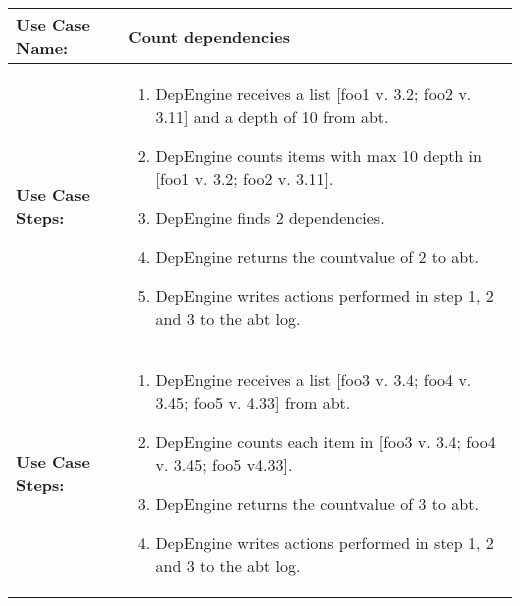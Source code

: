 
\begin{tabularx}{\linewidth}{|l|X|}
\hline
\textbf{Use Case Name:} & \textbf{Count dependencies} \\
\hline
\textbf{Use Case Steps:} & 
\begin{minipage}{\linewidth} 
 \vspace{0.05em}
  \begin{enumerate}
   \item DepEngine receives a list [foo1 v. 3.2; foo2 v. 3.11] and a depth of 10 from abt.
   \item DepEngine counts items with max 10 depth in [foo1 v. 3.2; foo2 v. 3.11].
   \item DepEngine finds 2 dependencies.
   \item DepEngine returns the countvalue of 2 to abt.
   \item DepEngine writes actions performed in step 1, 2 and 3 to the abt log.
  \end{enumerate}
 \vspace{0.05em}
\end{minipage}
\\
\hline 
\textbf{Use Case Steps:} & 
\begin{minipage}{\linewidth} 
 \vspace{0.05em}
  \begin{enumerate}
   \item DepEngine receives a list [foo3 v. 3.4; foo4 v. 3.45; foo5 v. 4.33] from abt.
   \item DepEngine counts each item in [foo3 v. 3.4; foo4 v. 3.45; foo5 v4.33].
   \item DepEngine returns the countvalue of 3 to abt.
   \item DepEngine writes actions performed in step 1, 2 and 3 to the abt log.
  \end{enumerate}
 \vspace{0.05em}
\end{minipage}
\\
\hline
\end{tabularx}


